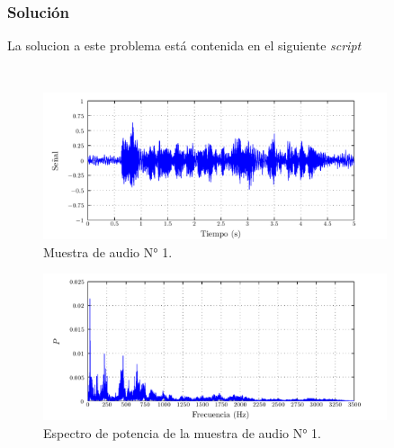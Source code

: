 \documentclass[a4paper,12pt,final]{article}
\begin{document}
    \subsubsection*{Solución}
      \noindent La solucion a este problema está contenida en el siguiente \emph{script}
      \begin{listing}[H]
        \label{script:2.1a}
        \inputminted[lastline=41]{matlab}{./laboratorio_5/problema02.m}
      \end{listing}
      \vspace{-1em}
      \vfill

      \newpage
      \vspace{-1em}
      \begin{listing}[H]
        \label{script:2.1b}
        \inputminted[firstline=43]{matlab}{./laboratorio_5/problema02.m}
      \end{listing}
      \vspace{-1em}
      \vfill

      \newpage
      \begin{figure}[H]
        \begin{center}
          \caption{Muestra de audio N° 1.}
          \label{p2f1}
          \vspace{-1em}
          \includegraphics[width=0.9\textwidth]{./laboratorio_5/problema02_sample01_signal.pdf}
        \end{center}
      \end{figure}

      \begin{figure}[H]
        \begin{center}
          \caption{Espectro de potencia de la muestra de audio N° 1.}
          \label{p2f2}
          \vspace{-1em}
          \includegraphics[width=0.9\textwidth]{./laboratorio_5/problema02_sample01_power_spectrum.pdf}
        \end{center}
      \end{figure}
\end{document}
